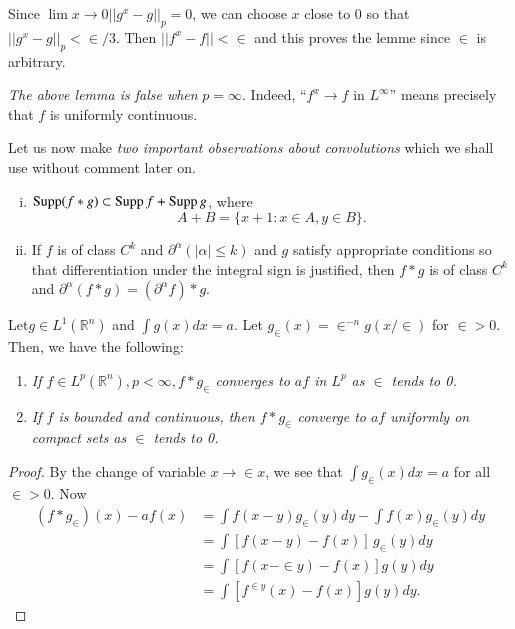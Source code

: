 Since $\lim\limits{x \to 0} || g^x-g ||_p =0$, we can choose $x$ close
to $0$ so that $|| g^x-g ||_p < \in /3$. Then $|| f^x-f || < \in$ and
this proves the lemme since $\in$ is arbitrary. 

\setcounter{rem}{4}
\begin{rem} \label{chap1:sec1:rem1.5}%
  \textit{The above lemma is false when} $p = \infty$. Indeed, ``$f^x
  \to f$ in $L^\infty$'' means precisely that $f$ is uniformly
  continuous. 
\end{rem}

Let us now make \textit{two important observations about convolutions}
which we shall use without comment later on. 
\begin{enumerate}[i)]
\item $\operatorname{Supp} (f*g) \subset \operatorname{Supp} f + \operatorname{Supp} g$, where
  $$
  A+B = \{ x+1: x \in A, y \in B \}.
  $$
\item If $f$ is of class $C^k$ and $\partial^\alpha (|\alpha| \leq
  k)$ and $g$ satisfy appropriate conditions so that differentiation
  under the integral sign is justified, then $f *g$ is of class $C^k$
  and $\partial^\alpha (f*g)=(\partial^\alpha f)*g$. 
\end{enumerate}

\setcounter{thm}{5}
\begin{thm} \label{chap1:sec1:thm1.6}%
  Let\pageoriginale $g \in L^1 (\mathbb{R}^n)$ and $\int g (x)dx
  =a$. Let $g_ \in (x)= 
  \in ^{-n}g (x/ \in)$ for $\in >0$. Then, we have the following: 
  \begin{enumerate}[\rm i)]
  \item \textit{If $f \in L^p (\mathbb{R}^n), p < \infty,f*g _ \in$
    converges to $af$ in $L^p$ as $\in$ tends to 0.} 
  \item \textit{If $f$ is bounded and continuous, then $f*g_\in$
    converge to $af$ uniformly on compact sets as $\in$ tends to 0.} 
  \end{enumerate}
\end{thm}

\begin{proof}
  By the change of variable $x \to \in x$, we see that $\int g_\in
  (x)dx=a$ for all $\in > 0$. Now 
  \begin{align*}
    (f*g_\in)(x)-af (x) &= \int f(x-y)g_ \in (y)dy - \int f(x)g_\in (y)dy \\
    &=\int [f(x-y)-f(x)] \,g_ \in (y)dy \\
    &= \int [f(x- \in y)-f(x)] g(y)dy \\
    &=\int [f^{ \in y}(x)-f(x)]g (y)dy.
  \end{align*}
\end{proof}

